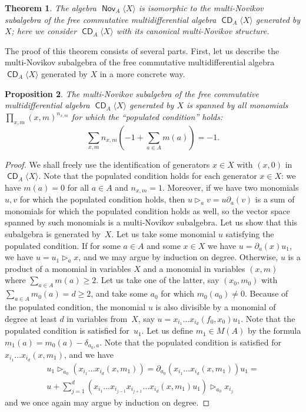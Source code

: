 \documentclass[10pt,a4paper]{article}
\newtheorem{theo}{Theorem}[section]
\newtheorem{prop}[theo]{Proposition}
\theoremstyle{definition}
\numberwithin{equation}{section}
\numberwithin{figure}{section}
\DeclareMathOperator{\CDi}{\mathsf{CD}}
\DeclareMathOperator{\Nov}{\mathsf{Nov}}
\begin{document}
\begin{theo}\label{th:freeNovikov}
The algebra $\Nov_A\langle X\rangle$ is isomorphic to the multi-Novikov subalgebra of the free commutative multidifferential algebra $\CDi_A\langle X\rangle$ generated by $X$; here we consider $\CDi_A\langle X\rangle$ with its canonical multi-Novikov structure.
\end{theo}

The proof of this theorem consists of several parts. First, let us describe the multi-Novikov subalgebra of the free commutative multidifferential algebra $\CDi_A\langle X\rangle$ generated by $X$ in a more concrete way.

\begin{prop}\label{prop:lowerbound}
The multi-Novikov subalgebra of the free commutative multidifferential algebra $\CDi_A\langle X\rangle$ generated by $X$ is spanned by all monomials $\prod_{x,m}(x,m)^{n_{x,m}}$ for which the ``populated condition'' holds:
\[
\sum_{x,m} n_{x,m}\left(-1+\sum_{a\in A}m(a)\right)=-1.
\]
\end{prop}

\begin{proof}
We shall freely use the identification of generators $x\in X$ with $(x,0)$ in $\CDi_A\langle X\rangle$. Note that the populated condition holds for each generator $x\in X$: we have $m(a)=0$ for all $a\in A$ and $n_{x,m}=1$. Moreover, if we have two monomials $u,v$ for which the populated condition holds, then $u\triangleright_a v=u\partial_a(v)$ is a sum of monomials for which the populated condition holds as well, so the vector space spanned by such monomials is a multi-Novikov subalgebra. Let us show that this subalgebra is generated by~$X$. Let us take some monomial $u$ satisfying the populated condition. If for some $a\in A$ and some $x\in X$ we have $u=\partial_a(x)u_1$, we have $u=u_1\triangleright_a x$, and we may argue by induction on degree. Otherwise, $u$ is a product of a monomial in variables $X$ and a monomial in variables $(x,m)$ where $\sum_{a\in A}m(a)\ge 2$. Let us take one of the latter, say $(x_0,m_0)$ with $\sum_{a\in A}m_0(a)=d\ge 2$, and take some $a_0$ for which $m_0(a_0)\ne 0$. Because of the populated condition, the monomial $u$ is also divisible by a monomial of degree at least $d$ in variables from~$X$, say $u=x_{i_1}\dots x_{i_d}(f_0,x_0)u_1$. Note that the populated condition is satisfied for~$u_1$. Let us define $m_1\in M(A)$ by the formula $m_1(a)=m_0(a)-\delta_{a_0,a}$. Note that the populated condition is satisfied for $x_{i_1}\dots x_{i_d}(x,m_1)$, and we have
\begin{multline}
u_1\triangleright_{a_0}(x_{i_1}\dots x_{i_d}(x,m_1))=\partial_{a_0}(x_{i_1}\dots x_{i_d}(x,m_1))u_1=\\ u+\sum_{j=1}^d (x_{i_1}\dots x_{i_{j-1}} x_{i_{j+1}}\dots x_{i_d}(x,m_1)u_1)\triangleright_{a_0}x_{i_j}
\end{multline}
and we once again may argue by induction on degree.
\end{proof}
\end{document}
